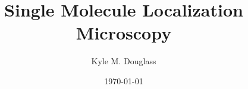 \documentclass[10pt,a4paper]{article}
\begin{document}
\title{Single Molecule Localization Microscopy}

\author{Kyle M. Douglass}

\date{\today}

\maketitle
\end{document}
